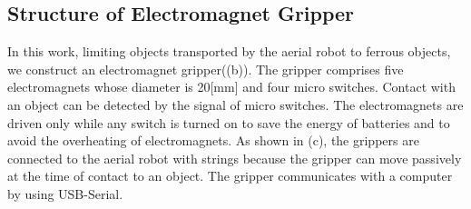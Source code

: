 \subsection{Structure of Electromagnet Gripper}
In this work, limiting objects transported by the aerial robot to ferrous objects, we construct an electromagnet gripper((b)). The gripper comprises five electromagnets whose diameter is 20[mm] and four micro switches. Contact with an object can be detected by the signal of micro switches. The electromagnets are driven only while any switch is turned on to save the energy of batteries and to avoid the overheating of electromagnets. As shown in (c), the grippers are connected to the aerial robot with strings because the gripper can move passively at the time of contact to an object. The gripper communicates with a computer by using USB-Serial.

